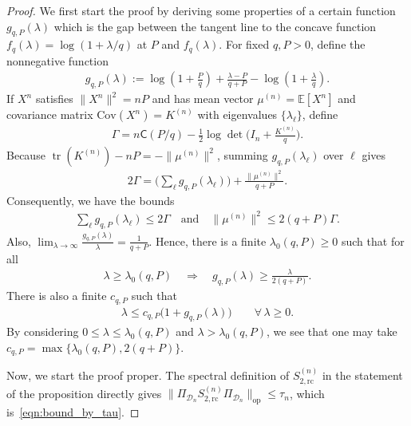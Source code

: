 \documentclass[11pt,onecolumn]{IEEEtran}
\newcommand{\calD}{\mathcal{D}}
\newcommand{\bbE}{\mathbb{E}}
\newcommand{\rvC}{\mathsf{C}}
\DeclareMathOperator{\tr}{tr}
\newcommand{\rc}{\mathrm{rc}}
\begin{document}
\begin{proof}
We first start the proof by deriving some properties of a certain function $g_{q,P}(\lambda )$ which is the gap between the tangent line to the concave function $f_q(\lambda)=\log(1+\lambda/q)$ at $P$ and $f_q(\lambda )$. For fixed $q,P>0$, define the nonnegative function
\begin{align}
    g_{q,P}(\lambda):=\log\left(1+\frac{P}{q} \right)+\frac{\lambda-P}{q+P}-\log\left( 1+\frac{\lambda}{q}\right).
\end{align}
If $X^n$ satisfies $\|X^n\|^2=nP$ and has mean vector $\mu^{(n)} = \bbE[X^n] $ and covariance matrix $\mathrm{Cov}(X^n)=K^{(n)}$ with eigenvalues $\{\lambda_\ell\}$, define 
\begin{align}
    \Gamma=n\rvC(P/q)-\frac{1}{2}\log\det\bigg( I_n+\frac{ K^{(n)}}{q}\bigg).
\end{align}
Because $\tr( K^{(n)})-nP=-\| \mu^{(n)}\|^2$, summing $g_{q,P}(\lambda_\ell)$ over $\ell$ gives
\begin{align}
    2\Gamma = \bigg(\sum_\ell g_{q,P}(\lambda_\ell) \bigg)+ \frac{ \|\mu^{(n)} \|^2}{q+P}. \label{eqn:sumg}
\end{align}
Consequently, we have the bounds
\begin{align}
    \sum_\ell g_{q,P}(\lambda_\ell)\le 2\Gamma\quad\mbox{and}\quad  \|\mu^{(n)} \|^2\le 2(q+P)\Gamma.  \label{eqn:bounds_g}
\end{align}
Also, $\lim_{\lambda\to\infty}\frac{g_{q,P}(\lambda)}{\lambda}=\frac{1}{q+P}$.
Hence, there is a finite $\lambda_0(q,P)\ge0$ such that for all
\begin{align}
     \lambda\ge\lambda_0(q,P)\quad \Longrightarrow \quad g_{q,P}(\lambda)\ge\frac{\lambda}{2(q+P)}. \label{eqn:bounds_g_large}
\end{align}
There is also a finite $c_{q,P}$ such that  
\begin{align}
    \lambda\le c_{q,P}\big(1+ g_{q,P}(\lambda) \big)\qquad\forall\, \lambda\ge0. \label{eqn:bounds_g_small}
\end{align}
By considering $0\le\lambda\le\lambda_0(q,P)$ and $\lambda>\lambda_0(q,P)$, we see that one may take $c_{q,P}=\max\{\lambda_0(q,P),2(q+P)\}$.

Now, we start the proof proper. The spectral definition of $S_{2,\rc}^{(n)}$ in the statement of the proposition directly gives $\| \Pi_{\calD_n}S_{2,\rc}^{(n)} \Pi_{\calD_n}\|_{\mathrm{op}}\le \tau_n$, which is~\eqref{eqn:bound_by_tau}.


\end{proof}
\end{document}
